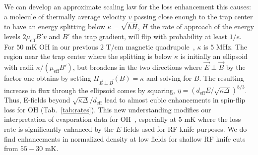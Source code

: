 \documentclass[%
 reprint,
 amsmath,amssymb,
 aps,
prl,
]{revtex4-1}
\newcommand{\epb}{{$\vec{E}\!\perp\!\vec{B}$}}
\newcommand{\epbm}{{\vec{E}\!\perp\!\vec{B}}}
\begin{document}
We can develop an approximate scaling law for the loss enhancement this causes: a molecule of thermally average velocity $v$ passing close enough to the trap center to have an energy splitting below $\kappa=\sqrt{\hbar \dot{H}}$, $\dot{H}$ the rate of approach of the energy levels $2\mu_\text{eff}B'v$ and $B'$ the trap gradient, will flip with probability at least $1/e$. 
For $50\text{ mK}$ OH in our previous $2\text{ T/cm}$ magnetic quadrupole~\cite{Sawyer2008},  $\kappa$ is $5\text{ MHz}$. 
The region near the trap center where the splitting is below $\kappa$ is initially an ellipsoid with radii $\kappa/(\mu_\text{eff}B')$, but broadens in the two directions where \epb{} by the factor one obtains by setting $H_\epbm(B)=\kappa$ and solving for $B$. 
The resulting increase in flux through the ellipsoid comes by squaring, $\eta = (d_\text{eff}E/\sqrt{\kappa\Delta})^{8/3}$. 
Thus, E-fields beyond $\sqrt{\kappa\Delta}/d_\text{eff}$ lead to almost cubic enhancements in spin-flip loss for OH (Tab.~\ref{tab:rates}). 
This new understanding modifies our interpretation of evaporation data for OH~\cite{Stuhl2012evap}, especially at $5\text{ mK}$ where the loss rate is significantly enhanced by the $E$-fields used for RF knife purposes. 
We do find enhancements in normalized density at low fields for shallow RF knife cuts from $55-30\text{ mK}$.

\end{document}
